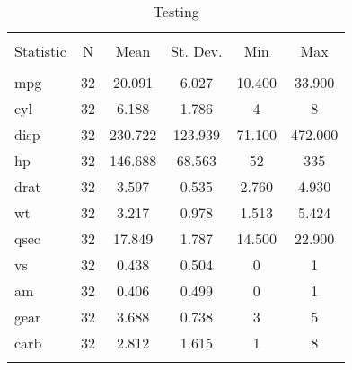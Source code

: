 
\begin{table}[!htbp] \centering 
  \caption{Testing} 
  \label{} 
\begin{tabular}{@{\extracolsep{5pt}}lccccc} 
\\[-1.8ex]\hline 
\hline \\[-1.8ex] 
Statistic & \multicolumn{1}{c}{N} & \multicolumn{1}{c}{Mean} & \multicolumn{1}{c}{St. Dev.} & \multicolumn{1}{c}{Min} & \multicolumn{1}{c}{Max} \\ 
\hline \\[-1.8ex] 
mpg & 32 & 20.091 & 6.027 & 10.400 & 33.900 \\ 
cyl & 32 & 6.188 & 1.786 & 4 & 8 \\ 
disp & 32 & 230.722 & 123.939 & 71.100 & 472.000 \\ 
hp & 32 & 146.688 & 68.563 & 52 & 335 \\ 
drat & 32 & 3.597 & 0.535 & 2.760 & 4.930 \\ 
wt & 32 & 3.217 & 0.978 & 1.513 & 5.424 \\ 
qsec & 32 & 17.849 & 1.787 & 14.500 & 22.900 \\ 
vs & 32 & 0.438 & 0.504 & 0 & 1 \\ 
am & 32 & 0.406 & 0.499 & 0 & 1 \\ 
gear & 32 & 3.688 & 0.738 & 3 & 5 \\ 
carb & 32 & 2.812 & 1.615 & 1 & 8 \\ 
\hline \\[-1.8ex] 
\end{tabular} 
\end{table} 
